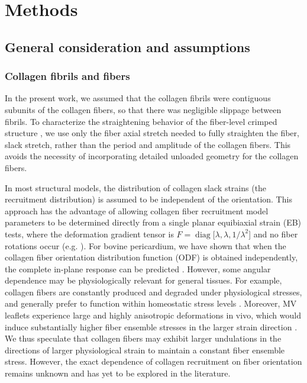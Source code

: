 \section{Methods}

\subsection{General consideration and assumptions}\label{sec:generalconsiderations}

\subsubsection{Collagen fibrils and fibers} \label{sec:collagenconsiderations}

    In the present work, we assumed that the collagen fibrils were contiguous subunits of the collagen fibers, so that there was negligible slippage between fibrils. To characterize the straightening behavior of the fiber-level crimped structure \cite{lanir_constitutive_1983, fata_insights_2014, sacks_incorporation_2003, lanir_structural_1979, kastelic_structural_1980, hansen_recruitment_2002, cacho_constitutive_2007, grytz_constitutive_2009}, we use only the fiber axial stretch needed to fully straighten the fiber, slack stretch, rather than the period and amplitude of the collagen fibers. This avoids the necessity of incorporating detailed unloaded geometry for the collagen fibers.


    In most structural models, the distribution of collagen slack strains (the recruitment distribution) is assumed to be independent of the orientation. This approach has the advantage of allowing collagen fiber recruitment model parameters to be determined directly from a single planar equibiaxial strain (EB) tests, where the deformation gradient tensor is $F = \operatorname{diag}[\lambda, \lambda, 1/\lambda^2$] and no fiber rotations occur (e.g. \cite{fata_insights_2014}). For bovine pericardium, we have shown that when the collagen fiber orientation distribution function (ODF) is obtained independently, the complete in-plane response can be predicted \cite{sacks_incorporation_2003}. However, some angular dependence may be physiologically relevant for general tissues. For example, collagen fibers are constantly produced and degraded under physiological stresses, and generally prefer to function within homeostatic stress levels \cite{humphrey_cardiovascular_2002}. Moreover, MV leaflets experience large and highly anisotropic deformations in vivo, which would induce substantially higher fiber ensemble stresses in the larger strain direction \cite{amini_vivo_2012,sacks_vivo_2006}. We thus speculate that collagen fibers may exhibit larger undulations in the directions of larger physiological strain to maintain a constant fiber ensemble stress. However, the exact dependence of collagen recruitment on fiber orientation remains unknown and has yet to be explored in the literature.
    
